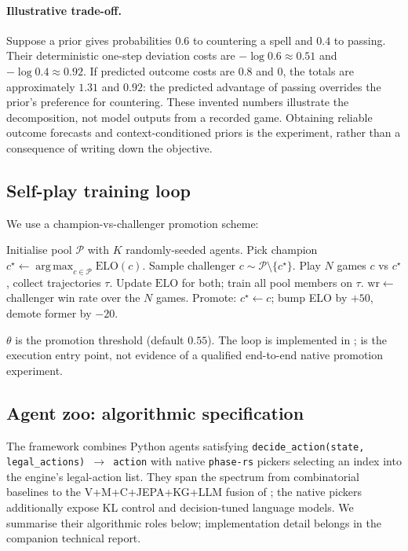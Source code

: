 \documentclass[11pt,a4paper]{article}
\theoremstyle{definition}
\theoremstyle{plain}
\DeclareMathOperator*{\argmax}{arg\,max}
\begin{document}
\paragraph{Illustrative trade-off.} Suppose a prior gives probabilities $0.6$ to countering a spell and $0.4$ to passing. Their deterministic one-step deviation costs are $-\log0.6\approx0.51$ and $-\log0.4\approx0.92$. If predicted outcome costs are $0.8$ and $0$, the totals are approximately $1.31$ and $0.92$: the predicted advantage of passing overrides the prior's preference for countering. These invented numbers illustrate the decomposition, not model outputs from a recorded game. Obtaining reliable outcome forecasts and context-conditioned priors is the experiment, rather than a consequence of writing down the objective.

\subsection{Self-play training loop}
\label{sec:selfplay}
We use a champion-vs-challenger promotion scheme:

\begin{algorithm}[H]
\caption{Champion-vs-Challenger Self-Play (Phase A.5).}
\label{alg:promotion}
\begin{algorithmic}[1]
\State Initialise pool $\mathcal{P}$ with $K$ randomly-seeded agents.
\State Pick champion $c^\star \gets \argmax_{c \in \mathcal{P}} \mathrm{ELO}(c)$.
  \State Sample challenger $c \sim \mathcal{P} \setminus \{c^\star\}$.
  \State Play $N$ games $c$ vs $c^\star$, collect trajectories $\tau$.
  \State Update $\mathrm{ELO}$ for both; train all pool members on $\tau$.
  \State $\mathrm{wr} \gets$ challenger win rate over the $N$ games.
    \State Promote: $c^\star \gets c$; bump ELO by $+50$, demote former by $-20$.
  \EndIf
\EndFor
\end{algorithmic}
\end{algorithm}
$\theta$ is the promotion threshold (default $0.55$). The loop is implemented in ;  is the execution entry point, not evidence of a qualified end-to-end native promotion experiment.

\subsection{Agent zoo: algorithmic specification}
\label{sec:agentzoo}
The framework combines Python agents satisfying \texttt{decide\_action(state, legal\_actions) $\to$ action} with native \texttt{phase-rs} pickers selecting an index into the engine's legal-action list. They span the spectrum from combinatorial baselines to the V+M+C+JEPA+KG+LLM fusion of ; the native pickers additionally expose KL control and decision-tuned language models. We summarise their algorithmic roles below; implementation detail belongs in the companion technical report.
\end{document}
